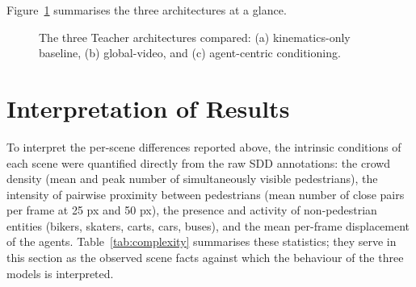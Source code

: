 \documentclass[11pt,a4paper]{article}
\begin{document}
Figure~\ref{fig:arch-combined} summarises the three architectures at a glance.

\begin{figure}[htpb]
    \centering
    \resizebox{\textwidth}{!}{}
    \caption{The three Teacher architectures compared: (a) kinematics-only
    baseline, (b) global-video, and (c) agent-centric conditioning.
    \label{fig:arch-combined}}
\end{figure}

\section{Interpretation of Results}
\label{sec:interpretation}

To interpret the per-scene differences reported above, the intrinsic conditions
of each scene were quantified directly from the raw SDD annotations: the crowd
density (mean and peak number of simultaneously visible pedestrians), the
intensity of pairwise proximity between pedestrians (mean number of close
pairs per frame at 25 px and 50 px), the presence and activity of
non-pedestrian entities (bikers, skaters, carts, cars, buses), and the mean
per-frame displacement of the agents. Table~\ref{tab:complexity} summarises
these statistics; they serve in this section as the observed scene facts
against which the behaviour of the three models is interpreted.
\end{document}
